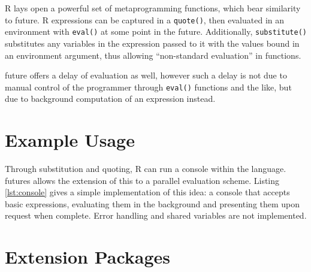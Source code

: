 \documentclass[10pt,a4paper]{article}
\begin{document}
R lays open a powerful set of metaprogramming functions, which bear
similarity to future. R expressions can be captured in a
\texttt{quote()}, then evaluated in an environment with \texttt{eval()}
at some point in the future. Additionally, \texttt{substitute()}
substitutes any variables in the expression passed to it with the
values bound in an environment argument, thus allowing ``non-standard
evaluation'' in functions.

future offers a delay of evaluation as well, however such a delay is
not due to manual control of the programmer through \texttt{eval()}
functions and the like, but due to background computation of an
expression instead.

\section{Example Usage}
\label{sec:examples}

Through substitution and quoting, R can run a console within the
language. futures allows the extension of this to a parallel
evaluation scheme. Listing \ref{lst:console} gives a simple implementation
of this idea: a console that accepts basic expressions, evaluating
them in the background and presenting them upon request when complete.
Error handling and shared variables are not implemented.



\section{Extension Packages}
\label{sec:extension-packages}
\end{document}

